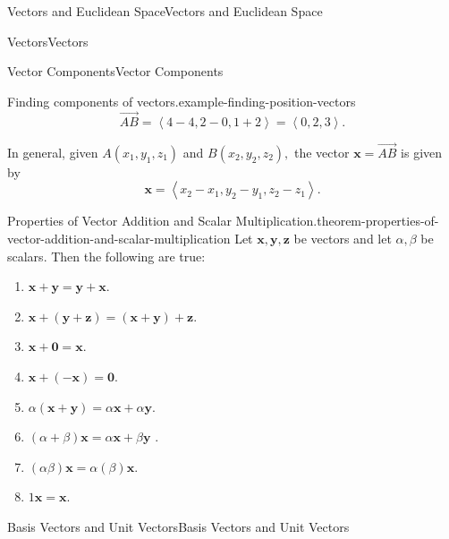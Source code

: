 \documentclass[10pt,]{book}
\numberwithin{equation}{section}
\newcommand{\vv}[1]{\mathbf{#1}}
\newcommand{\dotprod}[1]{\left\langle #1 \right\rangle}
\begin{document}
\begin{chapterptx}{Vectors and Euclidean Space}{}{Vectors and Euclidean Space}{}{}
\begin{sectionptx}{Vectors}{}{Vectors}{}{}
\begin{subsectionptx}{Vector Components}{}{Vector Components}{}{}
\begin{example}{Finding components of vectors.}{example-finding-position-vectors}
%
\begin{equation*}
\overrightarrow{AB} = \dotprod{4-4,2-0,1+2} = \dotprod{0,2,3}.
\end{equation*}
\end{example}
\hypertarget{p-880}{}%
In general, given \(A(x_{1},y_{1},z_{1})\) and \(B(x_{2},y_{2},z_{2}),\) the vector \(\vv{x} = \overrightarrow{AB}\) is given by%
%
\begin{equation*}
\vv{x} = \dotprod{x_{2}-x_{1},y_{2}-y_{1},z_{2}-z_{1}}.
\end{equation*}
\begin{theorem}{Properties of Vector Addition and Scalar Multiplication.}{}{theorem-properties-of-vector-addition-and-scalar-multiplication}%
\hypertarget{p-881}{}%
Let \(\vv{x},\vv{y},\vv{z}\) be vectors and let \(\alpha,\beta\) be scalars. Then the following are true:%
\leavevmode%
\begin{multicols}{2}
\begin{enumerate}
\item\hypertarget{li-68}{}\hypertarget{p-882}{}%
\(\vv{x}+\vv{y} = \vv{y}+\vv{x}\).%
\item\hypertarget{li-69}{}\hypertarget{p-883}{}%
\(\vv{x}+(\vv{y}+\vv{z}) = (\vv{x}+\vv{y})+\vv{z}.\)%
\item\hypertarget{li-70}{}\hypertarget{p-884}{}%
\(\vv{x}+\vv{0} = \vv{x}.\)%
\item\hypertarget{li-71}{}\hypertarget{p-885}{}%
\(\vv{x}+(-\vv{x}) = \vv{0}.\)%
\item\hypertarget{li-72}{}\hypertarget{p-886}{}%
\(\alpha(\vv{x}+\vv{y}) = \alpha\vv{x}+\alpha\vv{y}.\)%
\item\hypertarget{li-73}{}\hypertarget{p-887}{}%
\((\alpha+\beta)\vv{x} = \alpha\vv{x}+\beta\vv{y}\)%
. \item\hypertarget{li-74}{}\hypertarget{p-888}{}%
\((\alpha\beta)\vv{x} = \alpha(\beta)\vv{x}.\)%
\item\hypertarget{li-75}{}\hypertarget{p-889}{}%
\(1\vv{x} = \vv{x}.\)%
\end{enumerate}
\end{multicols}
\end{theorem}
\end{subsectionptx}
%
%
\typeout{************************************************}
\typeout{************************************************}
%
\begin{subsectionptx}{Basis Vectors and Unit Vectors}{}{Basis Vectors and Unit Vectors}{}{}\label{subsection-basis-vectors-and-unit-vectors}

\end{subsectionptx}
\end{sectionptx}
\end{chapterptx}
\end{document}
